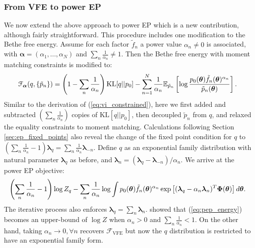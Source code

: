 \subsubsection{From VFE to power EP}
\label{sec:vfe_to_pep}
We now extend the above approach to power EP \citep{minka:powerep2004} which is a new contribution, although fairly straightforward. This procedure includes one modification to the Bethe free energy. Assume for each factor $\tilde{f}_n$ a power value $\alpha_n \neq 0$ is associated, with $\bm{\alpha} = (\alpha_1, ..., \alpha_N)$ and $\sum_n \frac{1}{\alpha_n} \neq 1$. Then the Bethe free energy with moment matching constraints is modified to:
\begin{equation}
\mathcal{F}_{\bm{\alpha}}(q, \{ \tilde{p}_n \}) = \left( 1 - \sum_n \frac{1}{\alpha_n} \right) \mathrm{KL}[q||p_0] - \sum_{n=1}^N \frac{1}{\alpha_n} \mathbb{E}_{\tilde{p}_n} \left[ \log \frac{p_0(\bm{\theta}) \tilde{f}_n(\bm{\theta})^{\alpha_n}}{\tilde{p}_n(\bm{\theta})} \right].
\label{eq:alpha_bethe}
\end{equation}
%
Similar to the derivation of (\ref{eq:vi_constrained}), here we first added and subtracted $(\sum_n \frac{1}{\alpha_n})$ copies of $\mathrm{KL}[q||p_0]$, then decoupled $\tilde{p}_n$ from $q$, and relaxed the equality constraints to moment matching. Calculations following Section \ref{sec:ep_fixed_points} also reveal the change of the fixed point condition for $q$ to $(\sum_n \frac{1}{\alpha_n} - 1) \bm{\lambda}_q = \sum_n \frac{1}{\alpha_n} \bm{\lambda}_{-n}$. Define $q$ as an exponential family distribution with natural parameter $\bm{\lambda}_q$ as before, and $\bm{\lambda}_n = (\bm{\lambda}_q - \bm{\lambda}_{-n}) / \alpha_n$. We arrive at the power EP objective:
\begin{equation}
\left( \sum_n \frac{1}{\alpha_n} - 1 \right) \log Z_q - \sum_n \frac{1}{\alpha_n} \log \int p_0(\bm{\theta}) \tilde{f}_n(\bm{\theta})^{\alpha_n} \exp \left[ (\bm{\lambda}_q - \alpha_n \bm{\lambda}_n)^T \bm{\Phi}(\bm{\theta}) \right] d \bm{\theta}.
\label{eq:pep_energy}
\end{equation}
The iterative process also enforces $\bm{\lambda}_q = \sum_n \bm{\lambda}_n$.  \cite{minka:divergence2005} showed that (\ref{eq:pep_energy}) becomes an upper-bound of $\log Z$ when $\alpha_n > 0$ and $\sum_n \frac{1}{\alpha_n} < 1$. On the other hand, taking $\alpha_n \rightarrow 0, \forall n$ recovers $\mathcal{F}_{\text{VFE}}$ but now the $q$ distribution is restricted to have an exponential family form.